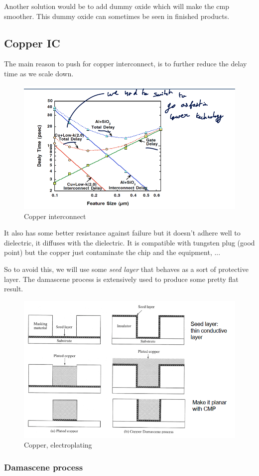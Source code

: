 \documentclass{report}
\begin{document}
Another solution would be to add dummy oxide which will make the \gls{cmp} smoother. This dummy oxide can sometimes be seen in finished products.

\subsection{Copper IC}

The main reason to push for copper interconnect, is to further reduce the delay time as we scale down.

\begin{figure}[H]
    \centering
    \includegraphics[width=0.5\linewidth]{copper_ic.png}
    \caption{Copper interconnect}
    \label{fig:enter-label}
\end{figure}

It also has some better resistance against failure but it doesn't adhere well to dielectric, it diffuses with the dielectric. It is compatible with tungsten plug (good point) but the copper just contaminate the chip and the equipment, ...

So to avoid this, we will use some \textit{seed layer} that behaves as a sort of protective layer. The damascene process is extensively used to produce some pretty flat result.

\begin{figure}[H]
    \centering
    \includegraphics[width=0.5\linewidth]{electroplating.png}
    \caption{Copper, electroplating}
    \label{fig:enter-label}
\end{figure}

\subsubsection{Damascene process}
\end{document}
